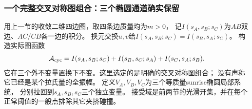 \documentclass[11pt,a4paper,oneside]{ctexart}
\theoremstyle{cnplain}
\theoremstyle{definition}
\theoremstyle{remark}
\numberwithin{equation}{section}
\begin{document}
\subsubsection{一个完整交叉对称图组合：三个椭圆通道确实保留}
用上一节的收敛二维四边图，取四条边质量均为$m>0$，
记$I(s_A,s_B;s_C)$为$AB$双边、$AC/CB$各一边的积分。
换元交换$u,v$给$I(s_A,s_B;s_C)=I(s_B,s_A;s_C)$。
构造实际图函数
\begin{equation}\label{unified:eq:cyclicice}
 \mathcal A_{\rm cyc}
 =I(s_A,s_B;s_C)+I(s_B,s_C;s_A)+I(s_C,s_A;s_B).
\end{equation}
它在三个外不变量置换下不变。这里选定的是明确的交叉对称图组合；
没有声称它已经是某个拉氏量的全振幅。
定义$V_A,V_B,V_C$为三个等质量sunrise椭圆局部系统，
分别拉回到$s_A,s_B,s_C$三个独立变量。
接受域是前两节的光滑开集，并在每个正常阈值的一般点排除其它夹挤碰撞。
\end{document}
